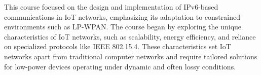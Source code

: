 

\indent \indent This course focused on the design and implementation of IPv6-based communications in IoT networks, emphasizing its adaptation to constrained environments such as LP-WPAN. The course began by exploring the unique characteristics of IoT networks, such as scalability, energy efficiency, and reliance on specialized protocols like IEEE 802.15.4. These characteristics set IoT networks apart from traditional computer networks and require tailored solutions for low-power devices operating under dynamic and often lossy conditions.
\vspace{0.25cm}

